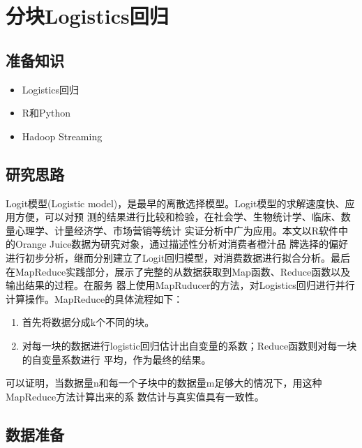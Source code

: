 \section{分块Logistics回归}\label{ux5b9eux4f8bux5206ux6790ux57faux4e8emapreduceux7684logisticsux56deux5f52}

\subsection{准备知识}\label{ux51c6ux5907ux77e5ux8bc6}

\begin{itemize}
\itemsep1pt\parskip0pt
\item
  Logistics回归
\item
  R和Python
\item
  Hadoop Streaming
\end{itemize}

\subsection{研究思路}\label{ux7814ux7a76ux601dux8def}

Logit模型(Logistic model)，是最早的离散选择模型。Logit模型的求解速度快、应用方便，可以对预
测的结果进行比较和检验，在社会学、生物统计学、临床、数量心理学、计量经济学、市场营销等统计
实证分析中广为应用。本文以R软件中的Orange Juice数据为研究对象，通过描述性分析对消费者橙汁品
牌选择的偏好进行初步分析，继而分别建立了Logit回归模型，对消费数据进行拟合分析。最后
在MapReduce实践部分，展示了完整的从数据获取到Map函数、Reduce函数以及输出结果的过程。在服务
器上使用MapRuducer的方法，对Logistics回归进行并行计算操作。MapReduce的具体流程如下：

\begin{enumerate}
\def\labelenumi{\arabic{enumi}.}
\item
  首先将数据分成k个不同的块。
\item
  对每一块的数据进行logistic回归估计出自变量的系数；Reduce函数则对每一块的自变量系数进行
  平均，作为最终的结果。
\end{enumerate}

可以证明，当数据量n和每一个子块中的数据量m足够大的情况下，用这种MapReduce方法计算出来的系
数估计与真实值具有一致性。

\subsection{数据准备}\label{ux6570ux636eux51c6ux5907}

